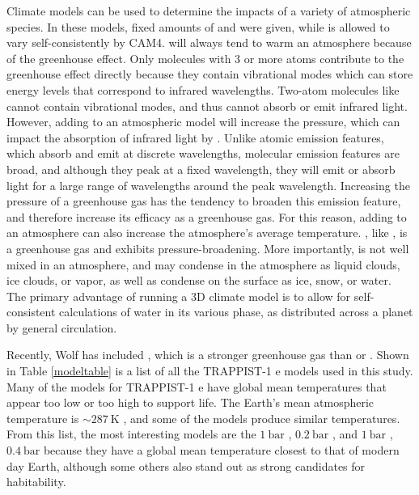 Climate models can be used to determine the impacts of a variety of atmospheric
 species. In these models, fixed amounts of  and 
 were given, while  is allowed to vary self-consistently by CAM4.
  will always tend to warm an atmosphere because of
 the greenhouse effect. Only molecules with 3 or more atoms contribute
 to the greenhouse effect directly because they contain vibrational modes which
 can store energy levels that correspond to infrared wavelengths. Two-atom
 molecules like  cannot contain vibrational modes, and thus cannot
 absorb or emit infrared light. However, adding  to an atmospheric
 model will increase the pressure, which can impact the absorption of infrared
 light by . Unlike atomic emission features, which absorb and emit
 at discrete wavelengths, molecular emission features are broad, and although
 they peak at a fixed wavelength, they will emit or absorb light for a large
 range of wavelengths around the peak wavelength. Increasing the pressure of a
 greenhouse gas has the tendency to broaden this emission feature, and therefore
 increase its efficacy as a greenhouse gas. For this reason, adding 
 to an atmosphere can also increase the atmosphere's average temperature.
 , like , is a greenhouse gas and exhibits
 pressure-broadening. More importantly,  is not well mixed
 in an atmosphere, and may condense in the atmosphere as liquid clouds, ice
 clouds, or vapor, as well as condense on the surface as ice, snow, or water.
 The primary advantage of running a 3D climate model is to allow for
 self-consistent calculations of water in its various phase, as distributed
 across a planet by general circulation.

Recently, Wolf has included , which is a stronger greenhouse gas than
  or
 . Shown in Table \ref{modeltable} is a list of all the TRAPPIST-1
 e models used in this study.
 Many of the models for TRAPPIST-1 e have global mean temperatures
 that appear too low or too high to support life. The Earth's mean atmospheric
 temperature is $\sim\SI{287}{\kelvin}$ \citep{meanearthtemp}, and some of the
 models produce similar temperatures. From this list, the most interesting
 models are the $\SI{1}{\bar}$ , $\SI{0.2}{\bar}$ , and
 $\SI{1}{\bar}$ ,
 $\SI{0.4}{\bar}$  because they have a global mean temperature
 closest to that of modern day Earth, although some others also stand out as
 strong candidates for habitability.

